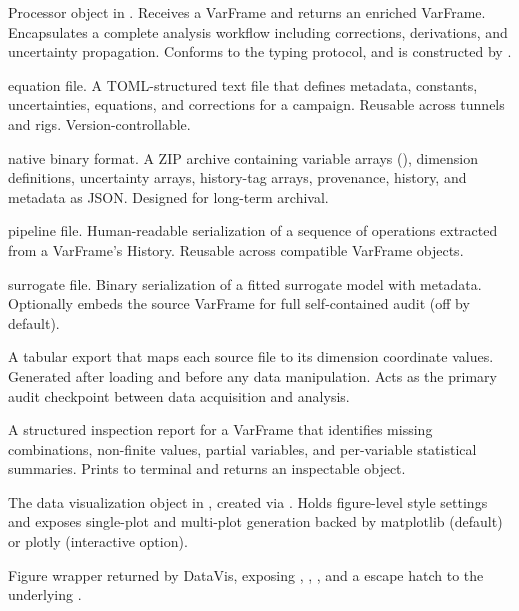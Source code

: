 \begin{description}[style=nextline,leftmargin=0pt]
\item[processor]
Processor object in \itc{}. Receives a VarFrame and returns an enriched
VarFrame. Encapsulates a complete analysis workflow including corrections,
derivations, and uncertainty propagation. Conforms to the 
typing protocol, and is constructed by
.

\item[.itceq]
\itc{} equation file. A TOML-structured text file that defines metadata,
constants, uncertainties, equations, and corrections for a campaign. Reusable
across tunnels and rigs. Version-controllable.

\item[.itc]
\itc{} native binary format. A ZIP archive containing variable arrays
(), dimension definitions, uncertainty arrays, history-tag arrays,
provenance, history, and metadata as JSON. Designed for long-term archival.

\item[.itc\_pipe]
\itc{} pipeline file. Human-readable serialization of a sequence of operations
extracted from a VarFrame's History. Reusable across compatible VarFrame
objects.

\item[.itc\_surr]
\itc{} surrogate file. Binary serialization of a fitted surrogate model with
metadata. Optionally embeds the source VarFrame for full self-contained audit
(off by default).

\item[manifest]
A tabular export that maps each source file to its dimension coordinate
values. Generated after loading and before any data manipulation. Acts as the
primary audit checkpoint between data acquisition and analysis.

\item[diagnostics]
A structured inspection report for a VarFrame that identifies missing
combinations, non-finite values, partial variables, and per-variable
statistical summaries. Prints to terminal and returns an inspectable
 object.

\item[DataVis]
The data visualization object in \itc{}, created via .
Holds figure-level style settings and exposes single-plot and multi-plot
generation backed by matplotlib (default) or plotly (interactive option).

\item[ItcFigure]
Figure wrapper returned by DataVis, exposing ,
, , and a  escape hatch to
the underlying .


\end{description}

